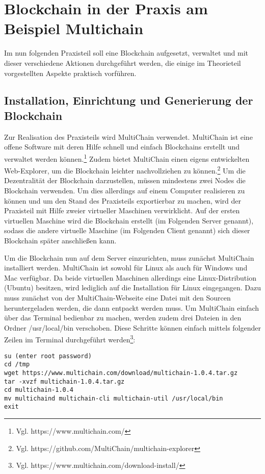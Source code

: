 \section{Blockchain in der Praxis am Beispiel Multichain}
\label{sec:Praxis}
Im nun folgenden Praxisteil soll eine Blockchain aufgesetzt, verwaltet und mit dieser verschiedene Aktionen durchgeführt werden, die einige im Theorieteil vorgestellten Aspekte praktisch vorführen.

\subsection{Installation, Einrichtung und Generierung der Blockchain}
\label{subsec:inst}
Zur Realisation des Praxisteils wird MultiChain verwendet. MultiChain ist eine offene Software mit deren Hilfe schnell und einfach Blockchains erstellt und verwaltet werden können.\footnote{Vgl. https://www.multichain.com/} Zudem bietet MultiChain einen eigens entwickelten Web-Explorer, um die Blockchain leichter nachvollziehen zu können.\footnote{Vgl. https://github.com/MultiChain/multichain-explorer} Um die Dezentralität der Blockchain darzustellen, müssen mindestens zwei Nodes die Blockchain verwenden. Um dies allerdings auf einem Computer realisieren zu können und um den Stand des Praxisteils exportierbar zu machen, wird der Praxisteil mit Hilfe zweier virtueller Maschinen verwirklicht. Auf der ersten virtuellen Maschine wird die Blockchain erstellt (im Folgenden Server genannt), sodass die andere virtuelle Maschine (im Folgenden Client genannt) sich dieser Blockchain später anschließen kann.

Um die Blockchain nun auf dem Server einzurichten, muss zunächst MultiChain installiert werden. MultiChain ist sowohl für Linux als auch für Windows und Mac verfügbar. Da beide virtuellen Maschinen allerdings eine Linux-Distribution (Ubuntu) besitzen, wird lediglich auf die Installation für Linux eingegangen. Dazu muss zunächst von der MultiChain-Webseite eine Datei mit den Sourcen heruntergeladen werden, die dann entpackt werden muss. Um MultiChain einfach über das Terminal bedienbar zu machen, werden zudem drei Dateien in den Ordner /usr/local/bin verschoben. Diese Schritte können einfach mittels folgender Zeilen im Terminal durchgeführt werden\footnote{Vgl. https://www.multichain.com/download-install/}:

\begin{lstlisting}[frame=single]
su (enter root password)
cd /tmp
wget https://www.multichain.com/download/multichain-1.0.4.tar.gz
tar -xvzf multichain-1.0.4.tar.gz
cd multichain-1.0.4
mv multichaind multichain-cli multichain-util /usr/local/bin
exit
\end{lstlisting}

